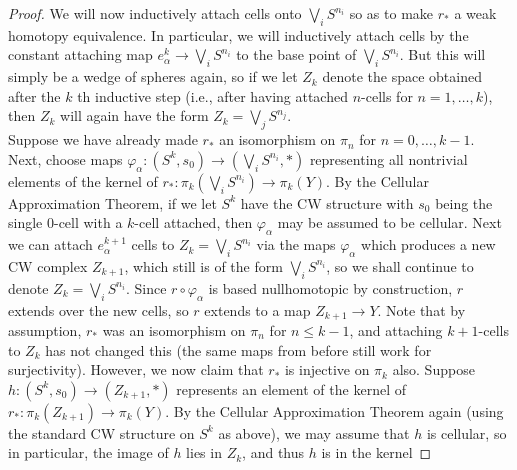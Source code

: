 \documentclass[reqno]{amsart}
\theoremstyle{definition}
\theoremstyle{remark}
\begin{document}
\begin{proof}
        We will now inductively attach cells onto
        $\bigvee_{i}S^{n_i}$ so as to make
        $r_*$ a weak homotopy equivalence. 
        In particular, we will inductively attach
         cells by the constant attaching map
         $e_{\alpha}^{k} \to \bigvee_{i} S^{n_i}$ to
         the base point of $\bigvee_i S^{n_i}$. But this
         will simply be a wedge of spheres again, so
         if we let $Z_k$ denote the space obtained after
         the $k$ th inductive step (i.e., after having attached
         $n$-cells for $n= 1,\ldots, k$), then 
         $Z_k$ will again have the form
         $Z_k = \bigvee_{j} S^{n_j}$.\\
        Suppose we have already made 
        $r_*$ an isomorphism on
        $\pi_n$ for $n = 0, \ldots, k-1$.\\
        Next, choose maps
        $\varphi_{\alpha} \colon \left( S^{k}, s_0 \right) \to 
        \left( \bigvee_{i} S^{n_i}, * \right)$ representing
        all nontrivial elements of the kernel of
        $r_* \colon \pi_{k} (\bigvee_i S^{n_i}) \to 
        \pi_k \left( Y \right)  $. By the Cellular Approximation
        Theorem, if we let $S^{k}$ have the
        CW structure with $s_0$ being the single $0$-cell with a
        $k$-cell attached, then $\varphi_{\alpha}$ may
        be assumed to be cellular. Next
        we can attach $e_{\alpha}^{k+1}$ cells to
        $Z_k= \bigvee_i S^{n_i}$ via the maps $\varphi_{\alpha}$ which
        produces a new CW complex $Z_{k+1}$, which still is
        of the form $\bigvee_i S^{n_i}$, so we shall continue
        to denote $Z_k = \bigvee_i S^{n_i}$. Since
        $r \circ \varphi_{\alpha} $ is based nullhomotopic by
        construction, $r$ extends over the new cells, so
        $r$ extends to a map
        $Z_{k+1} \to Y$. Note that
        by assumption, $r_*$ was an isomorphism
        on $\pi_n$ for $n\le k-1$, and attaching
        $k+1$-cells to $Z_{k}$ has not changed this (the same
        maps from before still work for surjectivity).
        However, we now claim that $r_*$ is injective on
        $\pi_k$ also.
        Suppose $h \colon \left( S^{k}, s_0 \right) 
        \to \left( Z_{k+1}, * \right) $ represents
        an element of the kernel
        of $r_* \colon \pi_{k} \left( Z_{k+1} \right) \to 
        \pi_k\left( Y \right) $. By the Cellular Approximation Theorem
        again (using the standard CW structure on $S^{k}$ as above),
        we may assume that $h$ is cellular, so
        in particular, the image of
        $h$ lies in $Z_{k}$, and thus
        $h$ is in the kernel

\end{proof}
\end{document}
